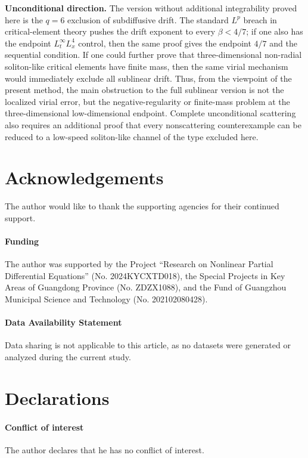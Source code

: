 \documentclass[smallextended,envcountsect,nospthms]{svjour3}
\numberwithin{equation}{section}
\theoremstyle{spbreak}
\theoremstyle{spdefbreak}
\theoremstyle{spdefbreak}
\newenvironment{acknowledgements}{\section*{Acknowledgements}}{}%
\begin{document}
\medskip
\noindent\textbf{Unconditional direction.} The version without additional integrability proved here is the $q=6$ exclusion of subdiffusive drift. The standard $L^p$ breach in critical-element theory pushes the drift exponent to every $\beta<4/7$; if one also has the endpoint $L_t^\infty L_x^4$ control, then the same proof gives the endpoint $4/7$ and the sequential condition. If one could further prove that three-dimensional non-radial soliton-like critical elements have finite mass, then the same virial mechanism would immediately exclude all sublinear drift. Thus, from the viewpoint of the present method, the main obstruction to the full sublinear version is not the localized virial error, but the negative-regularity or finite-mass problem at the three-dimensional low-dimensional endpoint. Complete unconditional scattering also requires an additional proof that every nonscattering counterexample can be reduced to a low-speed soliton-like channel of the type excluded here.

\begin{acknowledgements}
The author would like to thank the supporting agencies for their continued support.
\end{acknowledgements}

\paragraph{Funding}
The author was supported by the Project ``Research on Nonlinear Partial Differential Equations'' (No. 2024KYCXTD018), the Special Projects in Key Areas of Guangdong Province (No. ZDZX1088), and the Fund of Guangzhou Municipal Science and Technology (No. 202102080428).

\paragraph{Data Availability Statement}
Data sharing is not applicable to this article, as no datasets were generated or analyzed during the current study.

\section*{Declarations}
\paragraph{Conflict of interest}
The author declares that he has no conflict of interest.
\end{document}
